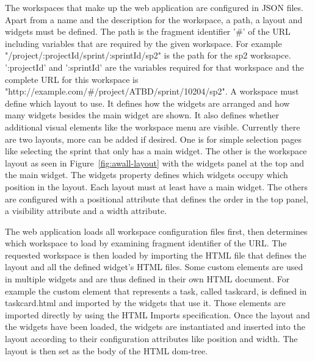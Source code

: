 \documentclass{sigchi}
\begin{document}
The workspaces that make up the web application are configured in JSON files. 
Apart from a name and the description for the workspace, a path, a layout and widgets must be defined. 
The path is the fragment identifier '\#' of the URL including variables that are required by the given workspace.
For example "/project/:projectId/sprint/:sprintId/sp2" is the path for the \gls{sp2} worksapce.
':projectId' and ':sprintId' are the variables required for that workspace and the complete URL for this workspace is "http://example.com/\#/project/ATBD/sprint/10204/sp2".
A workspace must define which layout to use.
It defines how the widgets are arranged and how many widgets besides the main widget are shown.
It also defines whether additional visual elements like the workspace menu are visible.
Currently there are two layouts, more can be added if desired.
One is for simple selection pages like selecting the sprint that only has a main widget.
The other is the workspace layout as seen in Figure~\ref{fig:awall-layout} with the widgets panel at the top and the main widget.
The widgets property defines which widgets occupy which position in the layout.
Each layout must at least have a main widget.
The others are configured with a positional attribute that defines the order in the top panel, a visibility attribute and a width attribute.

The web application loads all workspace configuration files first, then determines which workspace to load by examining fragment identifier of the URL.
The requested workspace is then loaded by importing the HTML file that defines the layout and all the defined widget's HTML files.
Some custom elements are used in multiple widgets and are thus defined in their own HTML document.
For example the custom element that represents a task, called taskcard, is defined in taskcard.html and imported by the widgets that use it.
Those elements are imported directly by using the HTML Imports specification.
Once the layout and the widgets have been loaded, the widgets are instantiated and inserted into the layout according to their configuration attributes like position and width.
The layout is then set as the body of the HTML \gls{dom}-tree.
\end{document}

